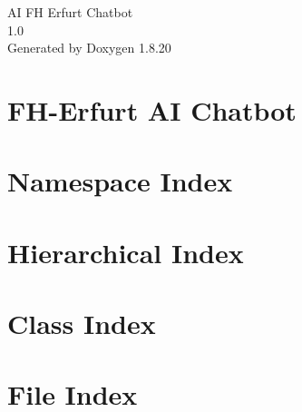 \let\mypdfximage\pdfximage\def\pdfximage{\immediate\mypdfximage}\documentclass[twoside]{book}
\newcommand{\+}{\discretionary{\mbox{\scriptsize$\hookleftarrow$}}{}{}}
\newcommand{\clearemptydoublepage}{%
  \newpage{\pagestyle{empty}\cleardoublepage}%
}
\begin{document}
\hypersetup{pageanchor=false,
             bookmarksnumbered=true,
             pdfencoding=unicode
            }
\begin{titlepage}
\vspace*{7cm}
\begin{center}%
{\Large AI FH Erfurt Chatbot \\[1ex]\large 1.\+0 }\\
\vspace*{1cm}
{\large Generated by Doxygen 1.8.20}\\
\end{center}
\end{titlepage}
\clearemptydoublepage
{}
\tableofcontents
\clearemptydoublepage
{}
\hypersetup{pageanchor=true}

\chapter{F\+H-\/\+Erfurt AI Chatbot}
\label{md__c___users_jankl__pycharm_projects_fhe_chatbot__r_e_a_d_m_e}

\chapter{Namespace Index}

\chapter{Hierarchical Index}

\chapter{Class Index}

\chapter{File Index}

\end{document}
